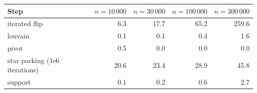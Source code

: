 \begin{tabular}{lrrrr}
\toprule
Step & $n=10\,000$ & $n=30\,000$ & $n=100\,000$ & $n=300\,000$\\
\midrule
iterated flip & 6.3 & 17.7 & 65.2 & 259.6\\
louvain & 0.1 & 0.1 & 0.4 & 1.6\\
pivot & 0.5 & 0.0 & 0.0 & 0.0\\
star packing (1e6 iterations) & 20.6 & 23.4 & 28.9 & 45.8\\
support & 0.1 & 0.2 & 0.6 & 2.7\\
\bottomrule
\end{tabular}
